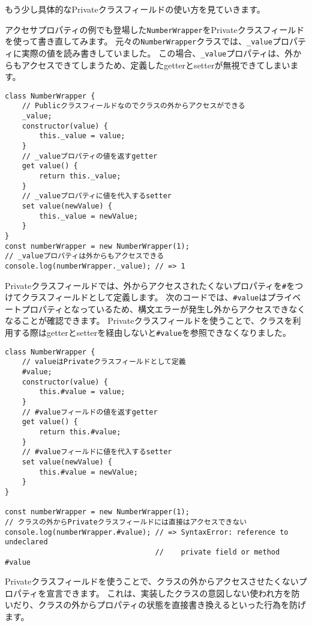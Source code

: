 もう少し具体的なPrivateクラスフィールドの使い方を見ていきます。

アクセサプロパティの例でも登場した\texttt{NumberWrapper}をPrivateクラスフィールドを使って書き直してみます。
元々の\texttt{NumberWrapper}クラスでは、\texttt{\_value}プロパティに実際の値を読み書きしていました。
この場合、\texttt{\_value}プロパティは、外からもアクセスできてしまうため、定義したgetterとsetterが無視できてしまいます。

\begin{lstlisting}
class NumberWrapper {
    // Publicクラスフィールドなのでクラスの外からアクセスができる
    _value;
    constructor(value) {
        this._value = value;
    }
    // _valueプロパティの値を返すgetter
    get value() {
        return this._value;
    }
    // _valueプロパティに値を代入するsetter
    set value(newValue) {
        this._value = newValue;
    }
}
const numberWrapper = new NumberWrapper(1);
// _valueプロパティは外からもアクセスできる
console.log(numberWrapper._value); // => 1
\end{lstlisting}

Privateクラスフィールドでは、外からアクセスされたくないプロパティを\texttt{\#}をつけてクラスフィールドとして定義します。
次のコードでは、\texttt{\#value}はプライベートプロパティとなっているため、構文エラーが発生し外からアクセスできなくなることが確認できます。
Privateクラスフィールドを使うことで、クラスを利用する際はgetterとsetterを経由しないと\texttt{\#value}を参照できなくなりました。

\begin{lstlisting}
class NumberWrapper {
    // valueはPrivateクラスフィールドとして定義
    #value;
    constructor(value) {
        this.#value = value;
    }
    // #valueフィールドの値を返すgetter
    get value() {
        return this.#value;
    }
    // #valueフィールドに値を代入するsetter
    set value(newValue) {
        this.#value = newValue;
    }
}

const numberWrapper = new NumberWrapper(1);
// クラスの外からPrivateクラスフィールドには直接はアクセスできない
console.log(numberWrapper.#value); // => SyntaxError: reference to undeclared 
                                   //    private field or method #value
\end{lstlisting}

Privateクラスフィールドを使うことで、クラスの外からアクセスさせたくないプロパティを宣言できます。
これは、実装したクラスの意図しない使われ方を防いだり、クラスの外からプロパティの状態を直接書き換えるといった行為を防げます。

